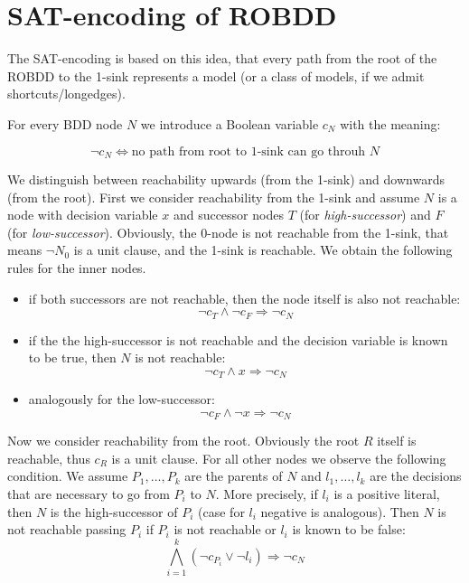 \documentclass{article}
\begin{document}
\section {SAT-encoding of ROBDD}

The SAT-encoding is based on this idea, that every path from the root of the 
ROBDD to the 1-sink represents a model (or a class of models, if we admit 
shortcuts/longedges). 

For every BDD node $N$ we introduce a Boolean variable $c_N$ with the meaning: 

\begin{equation}
  \neg c_N \Longleftrightarrow \mbox{no path from root to 1-sink can go throuh $N$}
\end{equation}


We distinguish between reachability upwards (from the 1-sink) and downwards 
(from the root). First we consider reachability from the 1-sink and assume $N$ 
is a node with decision variable $x$ and successor nodes $T$ (for 
\textit{high-successor}) and $F$ (for \textit{low-successor}). Obviously, the 
0-node is not reachable from the 1-sink, that means $\neg N_0$ is a unit 
clause, and the 1-sink is reachable. We obtain the following rules for the 
inner nodes. 

\begin{itemize}
\item if both successors are not reachable, then the node itself is also not reachable:
\begin{equation}
  \neg c_T\wedge\neg c_F\Rightarrow \neg c_N
\end{equation}
\item if the the high-successor is not reachable and the decision variable is known to be true, then $N$ is not reachable:
\begin{equation}
  \neg c_T\wedge x\Rightarrow \neg c_N
\end{equation}
\item analogously for the low-successor:
\begin{equation}
  \neg c_F\wedge \neg x\Rightarrow \neg c_N
\end{equation}
\end{itemize}

Now we consider reachability from the root. Obviously the root $R$ itself is 
reachable, thus $c_R$ is a unit clause. For all other nodes we observe the 
following condition. We assume $P_1, \ldots, P_k$ are the parents of $N$ and 
$l_1,\ldots, l_k$ are the decisions that are necessary to go from $P_i$ to $N$. 
More precisely, if $l_i$ is a positive literal, then $N$ is the high-successor 
of $P_i$ (case for $l_i$ negative is analogous). Then $N$ is not reachable 
passing $P_i$ if $P_i$ is not reachable or $l_i$ is known to be false: 
\begin{equation}
  \bigwedge_{i=1}^k{(\neg c_{P_i}\vee\neg l_i)}\Rightarrow \neg c_N
\end{equation}
\end{document}
